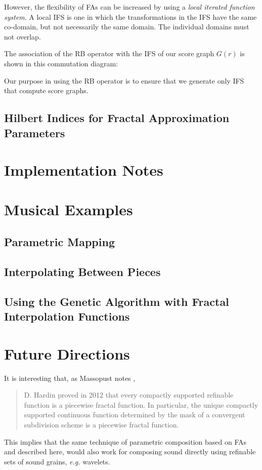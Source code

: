 \documentclass[english,11pt,letterpaper,onecolumn]{scrartcl}
\numberwithin{equation}{section}
\begin{document}

However, the flexibility of FAs can be increased by using a 
\textit{local iterated function system}. A local IFS is one in which the 
transformations in the IFS have the same co-domain, but not necessarily the 
same domain. The individual domains must not overlap.

The association of the RB operator with the IFS of our score graph $G(r)$ is 
shown in this commutation diagram:

Our purpose in using the RB operator is to ensure that we generate only IFS 
that compute score graphs.



    
    
    
    \subsection{Hilbert Indices for Fractal Approximation Parameters}
    
    \section{Implementation Notes}
    
    \section{Musical Examples}
    
    \subsection{Parametric Mapping}
    
    
    \subsection{Interpolating Between Pieces}
    
    
    \subsection{Using the Genetic Algorithm with Fractal Interpolation 
Functions}
    
    \section{Future Directions}
    
    It is interesting that, as Massopust notes \cite{massopust2017}, 
    \begin{quote}D. Hardin proved in 2012 that every compactly supported 
        refinable function is a piecewise fractal function. In particular, the 
unique 
        compactly supported continuous function determined by the mask of a 
convergent 
        subdivision scheme is a piecewise fractal function. \end{quote} 
    This implies that the same technique of parametric 
    composition based on FAs and described here, would also work for composing 
    sound directly using refinable sets of sound grains, \textit{e.g.} 
wavelets.
    
\end{document}
